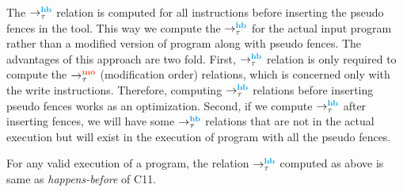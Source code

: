 \par
The $\setHB$ relation is computed for all instructions before inserting the 
pseudo fences in the tool. 
This way we compute the $\setHB$ for the actual input program rather than a 
modified version of program along with pseudo fences. The advantages of this
approach are two fold. First, $\setHB$ relation is only required 
to compute the $\setMO$ (modification order) relations, which is concerned only 
with the write instructions. Therefore, computing $\setHB$ relations before 
inserting pseudo fences works as an optimization. Second, if we compute $\setHB$
after inserting fences, we will have some $\setHB$ relations that are not in 
the actual execution but will exist in the execution of program with all the 
pseudo fences. 

\begin{lemma} For any valid execution of a program, the relation $\setHB$ computed 
	as above is same as \emph{happens-before} of C11.
\end{lemma}


